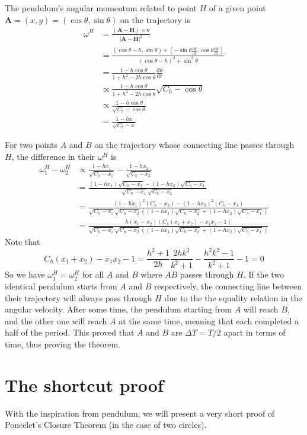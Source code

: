 \documentclass[]{article}
\newcommand{\ud}{\mathrm{d}}
\begin{document}
The pendulum's angular momentum related to point $H$ of a given point $\mathbf{A} = (x,y)=(\cos\theta,\sin\theta)$ on the trajectory is 
\begin{align*}
 \omega^H &= \frac{ (\mathbf{A}-\mathbf{H}) \times \mathbf{v} }{|\mathbf{A}-\mathbf{H}|^2}\\
 & = \frac{  (\cos\theta - h, \sin\theta) \times (-\sin\theta\frac{\ud \theta}{\ud t}, \cos\theta\frac{\ud \theta}{\ud t}) }{(\cos\theta - h)^2 + \sin^2\theta} \\
 &=\frac{1-h\cos\theta }{1 + h^2 - 2h\cos\theta} \frac{\ud \theta}{\ud t}\\
 &\propto \frac{1-h\cos\theta }{1 + h^2 - 2h\cos\theta}\sqrt{C_h - \cos\theta}\\
 &\propto \frac{1-h\cos\theta }{\sqrt{C_h - \cos\theta}}\\
 &= \frac{1-hx }{\sqrt{C_h - x}}
\end{align*}

For two points $A$ and $B$ on the trajectory whose connecting line passes through $H$, the difference in their $\omega^H$ is
\begin{align*}
\omega^H_1 - \omega^H_2 &\propto  \frac{1-hx_1 }{\sqrt{C_h - x_1}} -  \frac{1-hx_2 }{\sqrt{C_h - x_2}}\\
& =  \frac{(1-hx_1)\sqrt{C_h - x_2} - (1-hx_2)\sqrt{C_h - x_1}}{\sqrt{C_h - x_1}\sqrt{C_h - x_2}} \\
& =  \frac{(1-hx_1)^2(C_h - x_2) - (1-hx_2)^2(C_h - x_1)}{\sqrt{C_h - x_1}\sqrt{C_h - x_2}\left((1-hx_1)\sqrt{C_h - x_2} + (1-hx_2)\sqrt{C_h - x_1}\right)}\\
& =  \frac{h(x_1-x_2)(C_h(x_1+x_2)-x_1x_2-1)}{\sqrt{C_h - x_1}\sqrt{C_h - x_2}\left((1-hx_1)\sqrt{C_h - x_2} + (1-hx_2)\sqrt{C_h - x_1}\right)}
\end{align*}
Note that
\[
C_h(x_1+x_2)-x_1x_2-1 = \frac{h^2+1}{2h} \frac{2hk^2}{k^2+1} - \frac{h^2k^2-1}{k^2+1} - 1 = 0
\]
So we have $\omega^H_1 = \omega^H_2$ for all $A$ and $B$ where $AB$ passes through $H$. If the two identical pendulum starts from $A$ and $B$ respectively, the connecting line between their trajectory will always pass through $H$ due to the the equality relation in the angular velocity. After some time, the pendulum starting from $A$ will reach $B$, and the other one will reach $A$ at the same time, meaning that each completed a half of the period. This proved that $A$ and $B$ are $\Delta T = T/2$ apart in terms of time, thus proving the theorem.

\section{The shortcut proof}
With the inspiration from pendulum, we will present a very short proof of Poncelet's Closure Theorem (in the case of two circles). 
\end{document}
